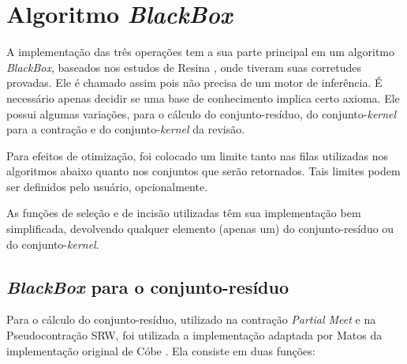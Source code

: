 \section{Algoritmo \textit{BlackBox}}

A implementação das três operações tem a sua parte principal em um algoritmo \textit{BlackBox}, baseados nos estudos de Resina \cite{logicaResina}, onde tiveram suas corretudes provadas. Ele é chamado assim pois não precisa de um motor de inferência. É necessário apenas decidir se uma base de conhecimento implica certo axioma. Ele possui algumas variações, para o cálculo do conjunto-resíduo, do conjunto-\textit{kernel} para a contração e do conjunto-\textit{kernel} da revisão.

Para efeitos de otimização, foi colocado um limite tanto nas filas utilizadas nos algoritmos abaixo quanto nos conjuntos que serão retornados. Tais limites podem ser definidos pelo usuário, opcionalmente.

As funções de seleção e de incisão utilizadas têm sua implementação bem simplificada, devolvendo qualquer elemento (apenas um) do conjunto-resíduo ou do conjunto-\textit{kernel}. 

\subsection{\textit{BlackBox} para o conjunto-resíduo}

Para o cálculo do conjunto-resíduo, utilizado na contração \textit{Partial Meet} e na Pseudocontração SRW, foi utilizada a implementação adaptada por Matos da implementação original de Cóbe \cite{logicaMatos}. Ela consiste em duas funções:

